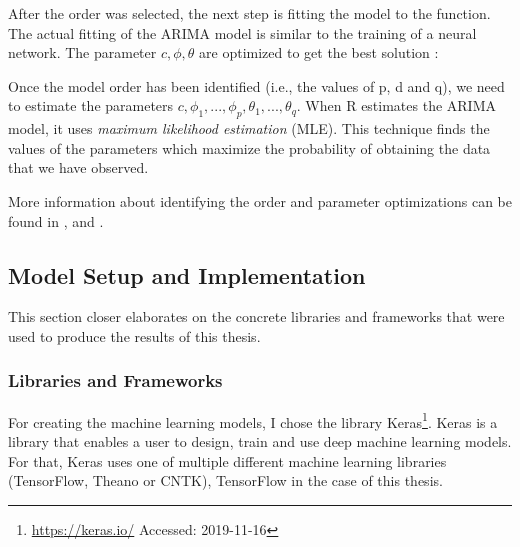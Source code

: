After the order was selected, the next step is fitting the model to the function.
The actual fitting of the ARIMA model is similar to the training of a neural network.
The parameter $c, \phi , \theta$ are optimized to get the best solution \cite{forecasting}:
\begin{displayquote}
	Once the model order has been identified (i.e., the values of p, d and q), we need to estimate the parameters $c, \phi_1,...,\phi_p, \theta_1,...,\theta_q$. When R estimates the ARIMA model, it uses \textit{maximum likelihood estimation} (MLE). This technique finds the values of the parameters which maximize the probability of obtaining the data that we have observed.
\end{displayquote}
More information about identifying the order and parameter optimizations can be found in \cite{TimeSeriesIntroduction}, \cite{TimeSeriesAnalysis} and \cite{001285997}.

\subsection{Model Setup and Implementation}
This section closer elaborates on the concrete libraries and frameworks that were used to produce the results of this thesis.
\subsubsection{Libraries and Frameworks}
For creating the machine learning models, I chose the library Keras\footnote{\url{https://keras.io/} Accessed: 2019-11-16}.
Keras is a library that enables a user to design, train and use deep machine learning models.
For that, Keras uses one of multiple different machine learning libraries (TensorFlow, Theano or CNTK), TensorFlow in the case of this thesis.

